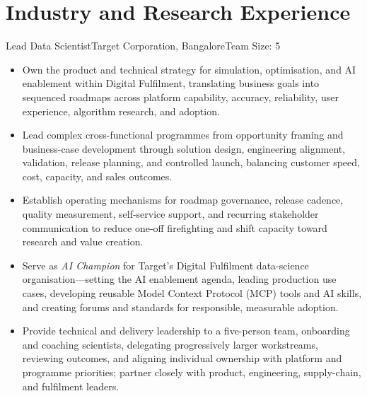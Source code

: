 \documentclass[11pt,a4paper]{moderncv}
\begin{document}
  \par\medskip
\endgroup

\hypertarget{industry-and-research-experience}{
\section{Industry and Research
Experience}\label{industry-and-research-experience}}

\nopagebreak
    {Lead Data Scientist}{Target Corporation, Bangalore}{}{Team Size: 5}{
    \begin{itemize}
        \item Own the product and technical strategy for simulation, optimisation, and AI enablement within Digital Fulfilment, translating business goals into sequenced roadmaps across platform capability, accuracy, reliability, user experience, algorithm research, and adoption.
        \item Lead complex cross-functional programmes from opportunity framing and business-case development through solution design, engineering alignment, validation, release planning, and controlled launch, balancing customer speed, cost, capacity, and sales outcomes.
        \item Establish operating mechanisms for roadmap governance, release cadence, quality measurement, self-service support, and recurring stakeholder communication to reduce one-off firefighting and shift capacity toward research and value creation.
        \item Serve as \textit{AI Champion} for Target's Digital Fulfilment data-science organisation---setting the AI enablement agenda, leading production use cases, developing reusable Model Context Protocol (MCP) tools and AI skills, and creating forums and standards for responsible, measurable adoption.
        \item Provide technical and delivery leadership to a five-person team, onboarding and coaching scientists, delegating progressively larger workstreams, reviewing outcomes, and aligning individual ownership with platform and programme priorities; partner closely with product, engineering, supply-chain, and fulfilment leaders.
    \end{itemize}
    }
\end{document}
